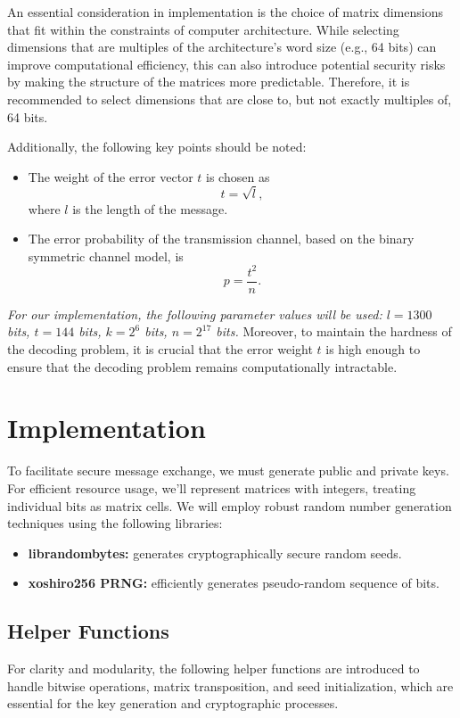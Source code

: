 An essential consideration in implementation is the choice of matrix dimensions that fit within the constraints of computer architecture. While selecting dimensions that are multiples of the architecture's word size (e.g., 64 bits) can improve computational efficiency, this can also introduce potential security risks by making the structure of the matrices more predictable. Therefore, it is recommended to select dimensions that are close to, but not exactly multiples of, 64 bits.

Additionally, the following key points should be noted:
\begin{itemize}
    \item The weight of the error vector $t$ is chosen as $$t = \sqrt{l},$$ where $l$ is the length of the message.
    \item The error probability of the transmission channel, based on the binary symmetric channel model, is $$p = \frac{t^2}{n}.$$
\end{itemize}

\textit{For our implementation, the following parameter values will be used: 
$l = 1300$ bits, $t = 144$ bits, $k = 2^{6}$ bits, $n = 2^{17}$ bits.} Moreover, to maintain the hardness of the decoding problem, it is crucial that the error weight $t$ is high enough to ensure that the decoding problem remains computationally intractable.

\section{Implementation}

To facilitate secure message exchange, we must generate public and private keys. For efficient resource usage, we'll represent matrices with integers, treating individual bits as matrix cells. We will employ robust random number generation techniques using the following libraries:
\begin{itemize}
    \item \textbf{librandombytes\cite{randombytes}:} generates cryptographically secure random seeds.
    \item \textbf{xoshiro256 PRNG\cite{DBLP:journals/toms/BlackmanV21}:} efficiently generates pseudo-random sequence of bits.
\end{itemize}

\subsection{Helper Functions}
For clarity and modularity, the following helper functions are introduced to handle bitwise operations, matrix transposition, and seed initialization, which are essential for the key generation and cryptographic processes.

